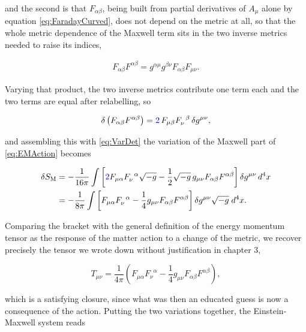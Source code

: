         and the second is that $F_{\alpha\beta}$, being built from partial derivatives of $A_{\mu}$ alone by equation \ref{eq:FaradayCurved}, does not depend on the metric at all, so that the whole metric dependence of the Maxwell term sits in the two inverse metrics needed to raise its indices,

        \begin{align*}
            F_{\alpha\beta}F^{\alpha\beta} = g^{\alpha\mu}g^{\beta\nu}F_{\alpha\beta}F_{\mu\nu}.
        \end{align*}

        Varying that product, the two inverse metrics contribute one term each and the two terms are equal after relabelling, so

        \begin{align*}
            \delta\left(F_{\alpha\beta}F^{\alpha\beta}\right) = {\color{blue}2}\,F_{\mu\beta}F_{\nu}^{\;\;\beta}\,\delta g^{\mu\nu},
        \end{align*}

        and assembling this with \ref{eq:VarDet} the variation of the Maxwell part of \ref{eq:EMAction} becomes

        \begin{align*}
            \delta S_{\text{M}} &= -\frac{1}{16\pi}\int\left[{\color{blue}2}F_{\mu\alpha}F_{\nu}^{\;\;\alpha}\sqrt{-g} - \frac{1}{2}\sqrt{-g}\,g_{\mu\nu}F_{\alpha\beta}F^{\alpha\beta}\right]\delta g^{\mu\nu}\,d^4x\\
            &= -\frac{1}{8\pi}\int\left[F_{\mu\alpha}F_{\nu}^{\;\;\alpha} - \frac{1}{4}g_{\mu\nu}F_{\alpha\beta}F^{\alpha\beta}\right]\delta g^{\mu\nu}\sqrt{-g}\;d^4x.
        \end{align*}

        Comparing the bracket with the general definition of the energy momentum tensor as the response of the matter action to a change of the metric, we recover precisely the tensor we wrote down without justification in chapter 3,

        \begin{equation}\label{eq:TemAgain}
            T_{\mu\nu} = \frac{1}{4\pi}\left(F_{\mu\alpha}F_{\nu}^{\;\;\alpha} - \frac{1}{4}g_{\mu\nu}F_{\alpha\beta}F^{\alpha\beta}\right),
        \end{equation}

        which is a satisfying closure, since what was then an educated guess is now a consequence of the action. Putting the two variations together, the Einstein-Maxwell system reads

